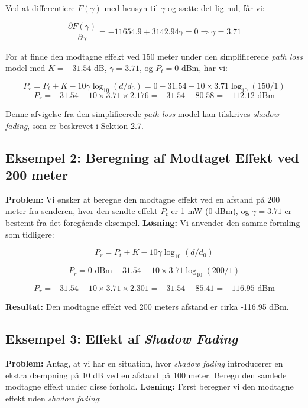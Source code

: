 \documentclass[a4paper,12pt]{book}
\begin{document}
	\noindent Ved at differentiere \( F(\gamma) \) med hensyn til \( \gamma \) og sætte det lig nul, får vi:
	
	\[
	\frac{\partial F(\gamma)}{\partial \gamma} = -11654.9 + 3142.94\gamma = 0 \Rightarrow \gamma = 3.71
	\]
	
	For at finde den modtagne effekt ved 150 meter under den simplificerede \textit{path loss} model med \( K = -31.54 \) dB, \( \gamma = 3.71 \), og \( P_t = 0 \) dBm, har vi:
	
	\[
	P_r = P_t + K - 10\gamma \log_{10}(d/d_0) = 0 - 31.54 - 10 \times 3.71 \log_{10}(150/1) 
	\]
	\[
	P_r = -31.54 - 10 \times 3.71 \times 2.176 = -31.54 - 80.58 = -112.12 \text{ dBm}
	\]
	
	\noindent Denne afvigelse fra den simplificerede \textit{path loss} model kan tilskrives \textit{shadow fading}, som er beskrevet i Sektion 2.7.
	
	\subsection{Eksempel 2: Beregning af Modtaget Effekt ved 200 meter}
	\textbf{Problem:} Vi ønsker at beregne den modtagne effekt ved en afstand på 200 meter fra senderen, hvor den sendte effekt \( P_t \) er 1 mW (0 dBm), og \( \gamma = 3.71 \) er bestemt fra det foregående eksempel.
	\newline\newline\noindent
	\textbf{Løsning:} Vi anvender den samme formling som tidligere:
	
	\[
	P_r = P_t + K - 10\gamma \log_{10}(d/d_0)
	\]
	
	\[
	P_r = 0 \text{ dBm} - 31.54 - 10 \times 3.71 \log_{10}(200/1)
	\]
	
	\[
	P_r = -31.54 - 10 \times 3.71 \times 2.301 = -31.54 - 85.41 = -116.95 \text{ dBm}
	\]
	
	\textbf{Resultat:} Den modtagne effekt ved 200 meters afstand er cirka -116.95 dBm.
	
	\subsection{Eksempel 3: Effekt af \textit{Shadow Fading}}
	
	\textbf{Problem:} Antag, at vi har en situation, hvor \textit{shadow fading} introducerer en ekstra dæmpning på 10 dB ved en afstand på 100 meter. Beregn den samlede modtagne effekt under disse forhold.
	\newline\newline\noindent
	\textbf{Løsning:} Først beregner vi den modtagne effekt uden \textit{shadow fading}:
	
\end{document}
